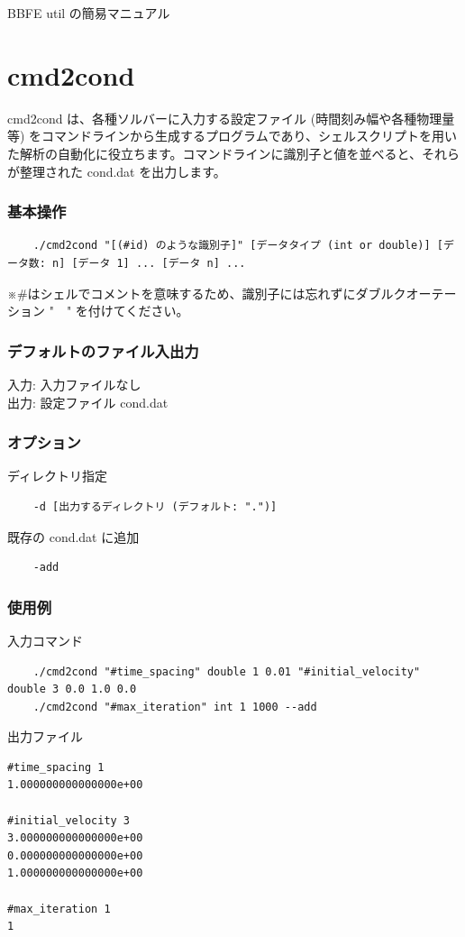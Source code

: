\documentclass[8pt,a4paper]{article}
\begin{document}
 

\begin{center}
	{\Large BBFE util の簡易マニュアル} \\
\end{center}

\tableofcontents

\section{cmd2cond}
cmd2cond は、各種ソルバーに入力する設定ファイル (時間刻み幅や各種物理量等) をコマンドラインから生成するプログラムであり、シェルスクリプトを用いた解析の自動化に役立ちます。コマンドラインに識別子と値を並べると、それらが整理された cond.dat を出力します。

\subsubsection*{基本操作}
\begin{verbatim}
    ./cmd2cond "[(#id) のような識別子]" [データタイプ (int or double)] [データ数: n] [データ 1] ... [データ n] ...
\end{verbatim}
※\#はシェルでコメントを意味するため、識別子には忘れずにダブルクオーテーション "　" を付けてください。 

\subsubsection*{デフォルトのファイル入出力}
入力: 入力ファイルなし \\ \noindent
出力: 設定ファイル cond.dat

\subsubsection*{オプション}
ディレクトリ指定
\begin{verbatim}
    -d [出力するディレクトリ (デフォルト: ".")]
\end{verbatim}
既存の cond.dat に追加
\begin{verbatim}
    -add
\end{verbatim}

\subsubsection*{使用例}
入力コマンド
\begin{verbatim}
    ./cmd2cond "#time_spacing" double 1 0.01 "#initial_velocity" double 3 0.0 1.0 0.0
    ./cmd2cond "#max_iteration" int 1 1000 --add
\end{verbatim}
出力ファイル
\begin{lstlisting}[]
#time_spacing 1
1.000000000000000e+00

#initial_velocity 3
3.000000000000000e+00
0.000000000000000e+00
1.000000000000000e+00

#max_iteration 1
1
\end{lstlisting}
\end{document}
